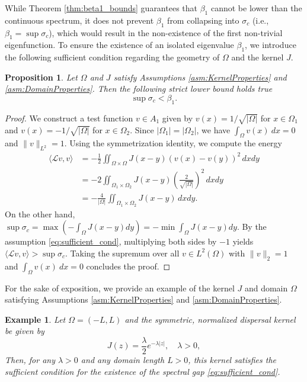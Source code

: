 \documentclass[11pt, a4paper]{article}
\theoremstyle{break}
\theoremstyle{break}
\newtheorem{prp}{Proposition}[section]
\theoremstyle{break}
\theoremstyle{break}
\theoremstyle{break}
\theoremstyle{break}
\theoremstyle{break}
\theoremstyle{break}
\theoremstyle{break}
\newtheorem{example}{Example}[section]
\begin{document}
While Theorem \ref{thm:beta1_bounds} guarantees that $\beta_1$ cannot be lower than the continuous spectrum, it does not prevent $\beta_1$ from collapsing into $\sigma_c$ (i.e., $\beta_1 = \sup \sigma_c$), which would result in the non-existence of the first non-trivial eigenfunction. To ensure the existence of an isolated eigenvalue $\beta_1$, we introduce the following sufficient condition regarding the geometry of $\Omega$ and the kernel $J$.

\begin{prp}
    \label{prop:spectral_gap}
    Let $\Omega$ and $J$ satisfy Assumptions \ref{asm:KernelProperties} and \ref{asm:DomainProperties}.
    Then the following strict lower bound holds true
    \begin{equation*}
        \sup \sigma_c < \beta_1.
    \end{equation*}
\end{prp}
\begin{proof}
    We construct a test function $v \in A_1$ given by $v(x) = 1/\sqrt{|\Omega|}$ for $x \in \Omega_1$ and $v(x) = -1/\sqrt{|\Omega|}$ for $x \in \Omega_2$. Since $|\Omega_1|=|\Omega_2|$, we have $\int_\Omega v(x)\:dx = 0$ and $\|v\|_{L^2}=1$. Using the symmetrization identity, we compute the energy
    \begin{align*}
        \langle \mathcal{L}v, v \rangle &= -\frac{1}{2} \iint_{\Omega \times \Omega} J(x-y)(v(x)-v(y))^2 \, dx dy \\
        &= -2 \iint_{\Omega_1 \times \Omega_2} J(x-y) \left( \frac{2}{\sqrt{|\Omega|}} \right)^2 \, dx dy \\
        &= -\frac{4}{|\Omega|} \iint_{\Omega_1 \times \Omega_2} J(x-y) \, dx dy.
    \end{align*}
    On the other hand, $\sup \sigma_c = \max (-\int_\Omega J(x-y)dy) = - \min \int_\Omega J(x-y)dy$. 
    By the assumption \eqref{eq:sufficient_cond}, multiplying both sides by $-1$ yields $\langle \mathcal{L}v, v \rangle > \sup \sigma_c$. Taking the supremum over all $v \in L^2(\Omega)$ with $\|v\|_2 = 1$ and $\int_\Omega v(x)\:dx = 0$ concludes the proof.
\end{proof}

For the sake of exposition, we provide an example of the kernel $J$ and domain $\Omega$ satisfying Assumptions \ref{asm:KernelProperties} and \ref{asm:DomainProperties}.
\begin{example}
    Let $\Omega = (-L, L)$ and the symmetric, normalized dispersal kernel be given by
    \begin{equation}
        J(z) = \frac{\lambda}{2} e^{-\lambda |z|}, \quad \lambda > 0,
    \end{equation}
    Then, for any $\lambda > 0$ and any domain length $L > 0$, this kernel satisfies the sufficient condition for the existence of the spectral gap \eqref{eq:sufficient_cond}.
\end{example}
\end{document}
